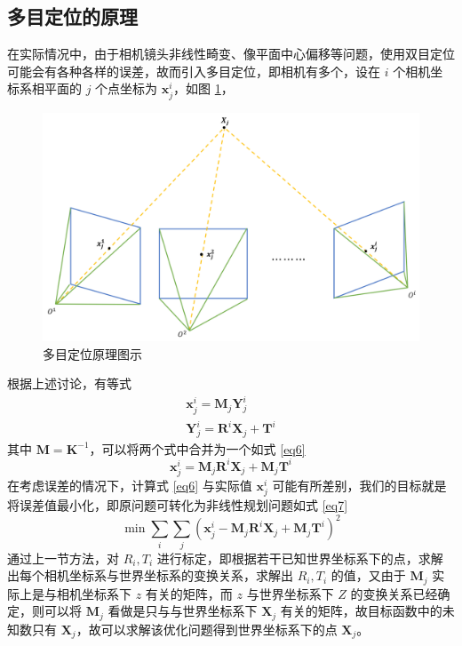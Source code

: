 \documentclass{article}
\numberwithin{equation}{section}						%
\numberwithin{figure}{section}							%
\begin{document}
\begin{sloppypar}
	\subsection{多目定位的原理}
	在实际情况中，由于相机镜头非线性畸变、像平面中心偏移等问题，使用双目定位可能会有各种各样的误差，故而引入多目定位，即相机有多个，设在 $i$ 个相机坐标系相平面的 $j$ 个点坐标为 ${\bm x^i_j}$，如图 \ref{duomu}，
	\begin{figure}[H]
		\centering
		\includegraphics[width=0.8\linewidth]{duomu}
		\caption{多目定位原理图示}
		\label{duomu}
	\end{figure}
	
	根据上述讨论，有等式
	\begin{equation}
		\begin{aligned}
			{\bm x^i_j} = {\bm M_j}{\bm Y^i_j} \\
			{\bm Y^i_j} = {\bm R^i}{\bm X_j} + {\bm T^i}
		\end{aligned}
	\end{equation}
	其中 ${\bm M} = {\bm K^{-1}}$，可以将两个式中合并为一个如式 \ref{eq6}
	\begin{equation}
		{\bm x^i_j} = {\bm M_j}{\bm R^i}{\bm X_j} + {\bm M_j}{\bm T^i}
		\label{eq6}
	\end{equation}
	在考虑误差的情况下，计算式 \ref{eq6} 与实际值 ${\bm x^i_j}$ 可能有所差别，我们的目标就是将误差值最小化，即原问题可转化为非线性规划问题如式 \ref{eq7}
	\begin{equation}
		\min\sum_{i}\sum_{j}({\bm x^i_j} - {\bm M_j}{\bm R^i}{\bm X_j} + {\bm M_j}{\bm T^i})^2
		\label{eq7}
	\end{equation}
	通过上一节方法，对 $R_i, T_i$ 进行标定，即根据若干已知世界坐标系下的点，求解出每个相机坐标系与世界坐标系的变换关系，求解出 $R_i, T_i$ 的值，又由于 ${\bm M_j}$ 实际上是与相机坐标系下 $z$ 有关的矩阵，而 $z$ 与世界坐标系下 $Z$ 的变换关系已经确定，则可以将 ${\bm M_j}$ 看做是只与与世界坐标系下 ${\bm X_j}$ 有关的矩阵，故目标函数中的未知数只有 ${\bm X_j}$，故可以求解该优化问题得到世界坐标系下的点 ${\bm X_j}$。

\end{sloppypar}
\end{document}
